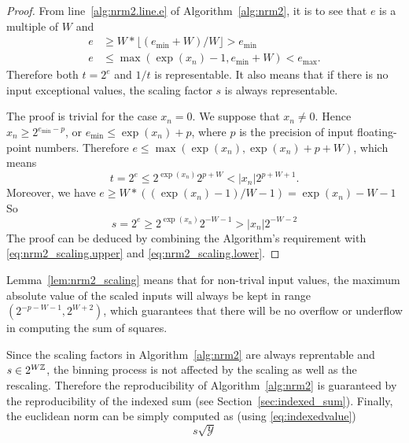     \begin{proof}
         From line~\ref{alg:nrm2.line.e} of Algorithm~\ref{alg:nrm2}, it is to see that
         $e$ is a multiple of $W$ and
         \[
            \begin{aligned}
                e & \geq W * \lfloor(e_{\min} + W) / W\rfloor > e_{\min} \\
                e & \leq \max(\exp(x_n) - 1, e_{\min} + W) < e_{\max}.
            \end{aligned}
         \]
         Therefore both $t=2^e$ and $1/t$ is representable.
         It also means that if there is no input exceptional values, the scaling factor $s$ is always representable.

        The proof is trivial for the case $x_n = 0$. We suppose that $x_n \neq 0$.
        Hence $x_n \geq 2^{e_{\min} - p}$, or $e_{\min} \leq \exp(x_n) + p$,
        where $p$ is the precision of input floating-point numbers.
        Therefore $e \leq \max(\exp(x_n), \exp(x_n) + p + W)$,
        which means
        \begin{equation}
            t = 2^e \leq 2^{\exp(x_n)} 2^{p+W} < |x_n| 2^{p+W+1}.
            \label{eq:nrm2_scaling.upper}
        \end{equation}
        Moreover, we have
        \(
            e \geq W * ((\exp(x_n) -  1) / W - 1) = \exp(x_n) - W -1
        \)
        So 
        \begin{equation}
            s = 2^e \geq 2^{\exp(x_n)} 2^{- W - 1} > |x_n| 2^{-W-2}
            \label{eq:nrm2_scaling.lower}
        \end{equation}
        The proof can be deduced by combining the Algorithm's requirement
        with \eqref{eq:nrm2_scaling.upper} and \eqref{eq:nrm2_scaling.lower}.
    \end{proof}

    Lemma~\ref{lem:nrm2_scaling} means that 
    for non-trival input values, the maximum absolute value of the scaled inputs
    will always be kept in range $(2^{-p-W-1}, 2^{W+2})$, which guarantees that
    there will be no overflow or underflow in computing the sum of squares.

    Since the scaling factors in Algorithm~\ref{alg:nrm2} are always reprentable and $s \in 2^{W\mathbb{Z}}$,
    the binning process is not affected by the scaling as well as the rescaling.
    Therefore the reproducibility of Algorithm~\ref{alg:nrm2} is guaranteed
    by the reproducibility of the indexed sum (see Section~\ref{sec:indexed_sum}).
    Finally, the euclidean norm can be simply computed as (using \eqref{eq:indexedvalue})
    \begin{equation}
      s \sqrt{\mathcal{Y}}
    \end{equation}

